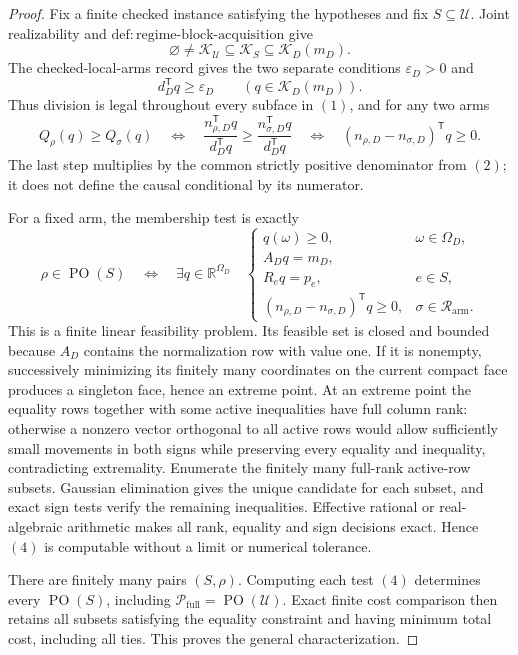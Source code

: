 \documentclass{article}
\begin{document}
\begin{proof}
Fix a finite checked instance satisfying the hypotheses and fix
\(S\subseteq\mathcal U\).  Joint realizability and
\(\mathrm{def:regime\text{-}block\text{-}acquisition}\) give
\[
\varnothing\ne\mathcal K_{\mathcal U}
\subseteq\mathcal K_S\subseteq\mathcal K_D(m_D).
\tag{1}
\]
The checked-local-arms record gives the two separate conditions
\(\varepsilon_D>0\) and
\[
d_D^{\mathsf T}q\geq\varepsilon_D
\qquad(q\in\mathcal K_D(m_D)).
\tag{2}
\]
Thus division is legal throughout every subface in \((1)\), and for any two arms
\[
Q_\rho(q)\geq Q_\sigma(q)
\quad\Longleftrightarrow\quad
\frac{n_{\rho,D}^{\mathsf T}q}{d_D^{\mathsf T}q}
\geq
\frac{n_{\sigma,D}^{\mathsf T}q}{d_D^{\mathsf T}q}
\quad\Longleftrightarrow\quad
(n_{\rho,D}-n_{\sigma,D})^{\mathsf T}q\geq0.
\tag{3}
\]
The last step multiplies by the common strictly positive denominator from \((2)\);
it does not define the causal conditional by its numerator.

For a fixed arm, the membership test is exactly
\[
\rho\in\operatorname{PO}(S)
\quad\Longleftrightarrow\quad
\exists q\in\mathbb R^{\Omega_D}\quad
\begin{cases}
q(\omega)\geq0,&\omega\in\Omega_D,\\
A_Dq=m_D,\\
R_eq=p_e,&e\in S,\\
(n_{\rho,D}-n_{\sigma,D})^{\mathsf T}q\geq0,
&\sigma\in\mathcal R_{\mathrm{arm}}.
\end{cases}
\tag{4}
\]
This is a finite linear feasibility problem.  Its feasible set is closed and bounded
because \(A_D\) contains the normalization row with value one.  If it is nonempty,
successively minimizing its finitely many coordinates on the current compact face
produces a singleton face, hence an extreme point.  At an extreme point the equality
rows together with some active inequalities have full column rank: otherwise a
nonzero vector orthogonal to all active rows would allow sufficiently small
movements in both signs while preserving every equality and inequality, contradicting
extremality.  Enumerate the finitely many full-rank active-row subsets.  Gaussian
elimination gives the unique candidate for each subset, and exact sign tests verify
the remaining inequalities.  Effective rational or real-algebraic arithmetic makes
all rank, equality and sign decisions exact.  Hence \((4)\) is computable without a
limit or numerical tolerance.

There are finitely many pairs \((S,\rho)\).  Computing each test \((4)\) determines
every \(\operatorname{PO}(S)\), including
\(\mathcal P_{\mathrm{full}}=\operatorname{PO}(\mathcal U)\).  Exact finite cost
comparison then retains all subsets satisfying the equality constraint and having
minimum total cost, including all ties.  This proves the general characterization.


\end{proof}
\end{document}
